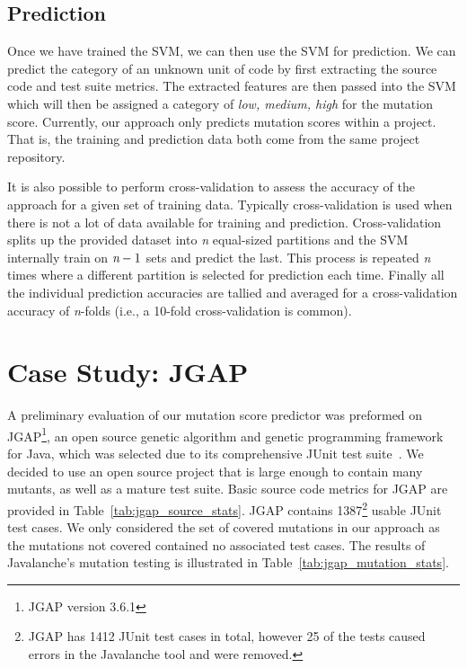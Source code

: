 \documentclass[conference]{IEEEtran}
\begin{document}
\subsection{Prediction}
\label{subsec:prediction}
Once we have trained the SVM, we can then use the SVM for prediction. We can predict the category of an unknown unit of code by first extracting the source code and test suite metrics. The extracted features are then passed into the SVM which will then be assigned a category of \textit{low, medium, high} for the mutation score.  Currently, our approach only predicts mutation scores within a project. That is, the training and prediction data both come from the same project repository.

It is also possible to perform cross-validation to assess the accuracy of the approach for a given set of training data. Typically cross-validation is used when there is not a lot of data available for training and prediction. Cross-validation splits up the provided dataset into \emph{n} equal-sized partitions and the SVM internally train on $\emph{n}-1$ sets and predict the last. This process is repeated \emph{n} times where a different partition is selected for prediction each time. Finally all the individual prediction accuracies are tallied and averaged for a cross-validation accuracy of \emph{n}-folds (i.e., a 10-fold cross-validation is common).


\section{Case Study: JGAP}
\label{sec:case_study}
A preliminary evaluation of our mutation score predictor was preformed on JGAP\footnote{JGAP version 3.6.1}, an open source genetic algorithm and genetic programming framework for Java, which was selected due to its comprehensive JUnit test suite~\cite{JGAP}. We decided to use an open source project that is large enough to contain many mutants, as well as a mature test suite. Basic source code metrics for JGAP are provided in Table~\ref{tab:jgap_source_stats}. JGAP contains 1387\footnote{JGAP has 1412 JUnit test cases in total, however 25 of the tests caused errors in the Javalanche tool and were removed.} usable JUnit test cases. We only considered the set of covered mutations in our approach as the mutations not covered contained no associated test cases. The results of Javalanche's mutation testing is illustrated in Table~\ref{tab:jgap_mutation_stats}.
\end{document}
